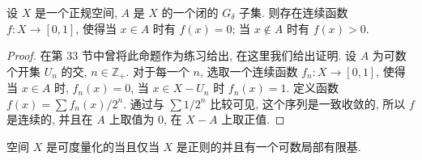 \documentclass[../../main.tex]{subfiles}
\begin{document}
\begin{lemma}\label{lemma:ch06-closed-g-delta-function}
设 $X$ 是一个正规空间, $A$ 是 $X$ 的一个闭的 $G_\delta$ 子集. 则存在连续函数 $f\colon X\to[0,1]$, 使得当 $x\in A$ 时有 $f(x)=0$; 当 $x\notin A$ 时有 $f(x)>0$.
\end{lemma}

\begin{proof}
在第 33 节中曾将此命题作为练习给出, 在这里我们给出证明. 设 $A$ 为可数个开集 $U_n$ 的交, $n\in\mathbb{Z}_+$. 对于每一个 $n$, 选取一个连续函数 $f_n\colon X\to[0,1]$, 使得当 $x\in A$ 时, $f_n(x)=0$, 当 $x\in X-U_n$ 时 $f_n(x)=1$. 定义函数 $f(x)=\sum f_n(x)/2^n$. 通过与 $\sum 1/2^n$ 比较可见, 这个序列是一致收敛的, 所以 $f$ 是连续的, 并且在 $A$ 上取值为 $0$, 在 $X-A$ 上取正值.
\end{proof}

\begin{theorem}\label{theorem:ch06-nagata-smirnov-metrization}
空间 $X$ 是可度量化的当且仅当 $X$ 是正则的并且有一个可数局部有限基.
\end{theorem}
\end{document}
